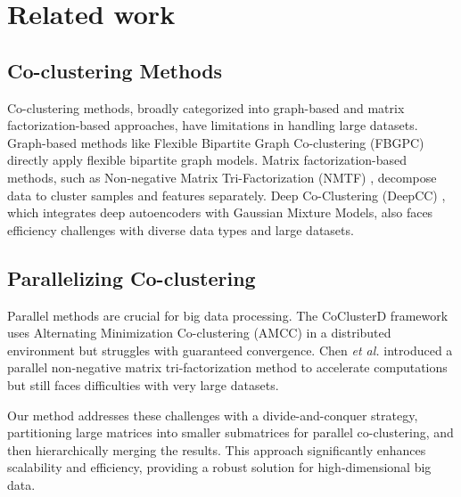 
\section{Related work}
\label{sec:related_work}
\subsection{Co-clustering Methods}
Co-clustering methods, broadly categorized into graph-based and matrix factorization-based approaches, have limitations in handling large datasets. Graph-based methods like Flexible Bipartite Graph Co-clustering (FBGPC) \cite{chen2023FastFlexibleBipartite} directly apply flexible bipartite graph models. Matrix factorization-based methods, such as Non-negative Matrix Tri-Factorization (NMTF) \cite{long2005CoclusteringBlockValue}, decompose data to cluster samples and features separately. Deep Co-Clustering (DeepCC) \cite{dongkuanxu2019DeepCoClustering}, which integrates deep autoencoders with Gaussian Mixture Models, also faces efficiency challenges with diverse data types and large datasets.

\subsection{Parallelizing Co-clustering}
Parallel methods are crucial for big data processing. The CoClusterD framework \cite{cheng2015CoClusterDDistributedFramework} uses Alternating Minimization Co-clustering (AMCC) in a distributed environment but struggles with guaranteed convergence. Chen \textit{et al.} \cite{chen2023ParallelNonNegativeMatrix} introduced a parallel non-negative matrix tri-factorization method to accelerate computations but still faces difficulties with very large datasets.

Our method addresses these challenges with a divide-and-conquer strategy, partitioning large matrices into smaller submatrices for parallel co-clustering, and then hierarchically merging the results. This approach significantly enhances scalability and efficiency, providing a robust solution for high-dimensional big data.
